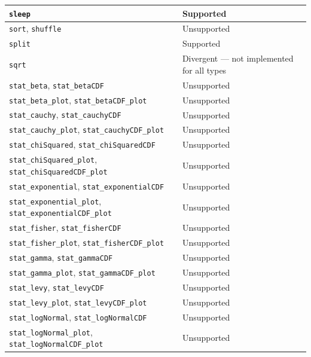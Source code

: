 \begin{longtable}{|p{4cm}|p{9cm}|}
        \hline
        \texttt{sleep} & Supported \\
        \hline
        \texttt{sort}, \texttt{shuffle} & Unsupported \\
        \hline
        \texttt{split} & Supported \\
        \hline
        \texttt{sqrt} & Divergent --- not implemented for all types \\
        \hline
        \texttt{stat\_beta}, \texttt{stat\_betaCDF} & Unsupported \\
        \hline
        \texttt{stat\_beta\_plot}, \texttt{stat\_betaCDF\_plot} & Unsupported \\
        \hline
        \texttt{stat\_cauchy}, \texttt{stat\_cauchyCDF} & Unsupported \\
        \hline
        \texttt{stat\_cauchy\_plot}, \texttt{stat\_cauchyCDF\_plot} & Unsupported \\
        \hline
        \texttt{stat\_chiSquared}, \texttt{stat\_chiSquaredCDF} & Unsupported \\
        \hline
        \texttt{stat\_chiSquared\_plot}, \texttt{stat\_chiSquaredCDF\_plot} & Unsupported \\
        \hline
        \texttt{stat\_exponential}, \texttt{stat\_exponentialCDF} & Unsupported \\
        \hline
        \texttt{stat\_exponential\_plot}, \texttt{stat\_exponentialCDF\_plot} & Unsupported \\
        \hline
        \texttt{stat\_fisher}, \texttt{stat\_fisherCDF} & Unsupported \\
        \hline
        \texttt{stat\_fisher\_plot}, \texttt{stat\_fisherCDF\_plot} & Unsupported \\
        \hline
        \texttt{stat\_gamma}, \texttt{stat\_gammaCDF} & Unsupported \\
        \hline
        \texttt{stat\_gamma\_plot}, \texttt{stat\_gammaCDF\_plot} & Unsupported \\
        \hline
        \texttt{stat\_levy}, \texttt{stat\_levyCDF} & Unsupported \\
        \hline
        \texttt{stat\_levy\_plot}, \texttt{stat\_levyCDF\_plot} & Unsupported \\
        \hline
        \texttt{stat\_logNormal}, \texttt{stat\_logNormalCDF} & Unsupported \\
        \hline
        \texttt{stat\_logNormal\_plot}, \texttt{stat\_logNormalCDF\_plot} & Unsupported \\
        \hline

\end{longtable}

